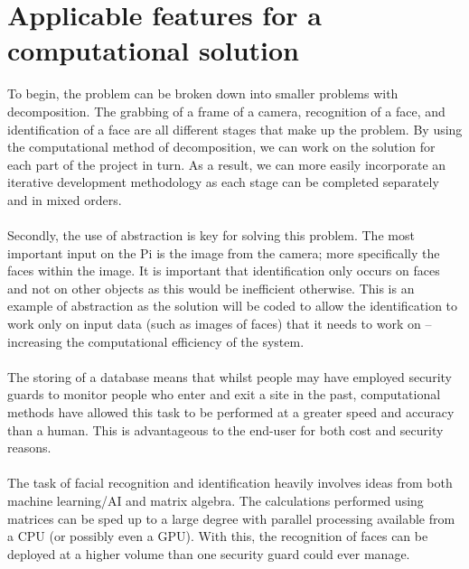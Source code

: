 \documentclass[9pt]{article}
\begin{document}
\section{Applicable features for a computational solution}\label{sec_essential}
To begin, the problem can be broken down into smaller problems with decomposition. The grabbing of a frame of a camera, recognition of a face, and identification of a face are all different stages that make up the problem. By using the computational method of decomposition, we can work on the solution for each part of the project in turn. As a result, we can more easily incorporate an iterative development methodology as each stage can be completed separately and in mixed orders.\\\\
Secondly, the use of abstraction is key for solving this problem. The most important input on the Pi is the image from the camera; more specifically the faces within the image. It is important that identification only occurs on faces and not on other objects as this would be inefficient otherwise. This is an example of abstraction as the solution will be coded to allow the identification to work only on input data (such as images of faces) that it needs to work on -- increasing the computational efficiency of the system.\\\\
The storing of a database means that whilst people may have employed security guards to monitor people who enter and exit a site in the past, computational methods have allowed this task to be performed at a greater speed and accuracy than a human. This is advantageous to the end-user for both cost and security reasons.\\\\
The task of facial recognition and identification heavily involves ideas from both machine learning/AI and matrix algebra. The calculations performed using matrices can be sped up to a large degree with parallel processing available from a CPU (or possibly even a GPU). With this, the recognition of faces can be deployed at a higher volume than one security guard could ever manage.
\end{document}
